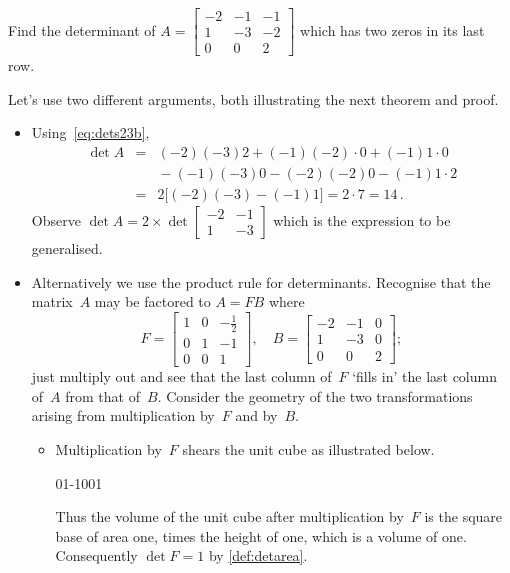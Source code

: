 \begin{example} \label{eg:}
Find the determinant of 
\(A=\begin{bmatrix} -2&-1&-1\\1&-3&-2\\0&0&2 \end{bmatrix}\)
which has two zeros in its last row.
\begin{solution} Let's use two different arguments, both illustrating the next theorem and proof.
\begin{itemize}
\item Using~\eqref{eq:dets23b},
\begin{eqnarray*}
\det A&=& (-2)(-3)2+(-1)(-2)\cdot0+(-1)1\cdot0
\\&&{}
-(-1)(-3)0-(-2)(-2)0-(-1)1\cdot2
\\&=&2\big[(-2)(-3)-(-1)1\big]=2\cdot7=14\,.
\end{eqnarray*}
Observe \(\det A=2\times\det\begin{bmatrix} -2&-1\\1&-3 \end{bmatrix}\) which is the expression to be generalised.

\item Alternatively we use the product rule for determinants. Recognise that the matrix~\(A\) may be factored to \(A=FB\) where
\begin{equation*}
F=\begin{bmatrix} 1&0&-\frac12\\0&1&-1\\0&0&1 \end{bmatrix},
\quad B=\begin{bmatrix} -2&-1&0\\1&-3&0\\0&0&2 \end{bmatrix};
\end{equation*}
just multiply out and see that the last column of~\(F\) `fills in' the last column of~\(A\) from that of~\(B\).
Consider the geometry of the two transformations arising from multiplication by~\(F\) and by~\(B\).
\begin{itemize}
\item Multiplication by~\(F\) shears the unit cube as illustrated below.
\begin{center}
01{-1}001
\end{center}
Thus the volume of the unit cube after multiplication by~\(F\) is the square base of area one, times the height of one, which is a volume of one.
Consequently \(\det F=1\) by \autoref{def:detarea}.


\end{itemize}
\end{itemize}
\end{solution}
\end{example}
